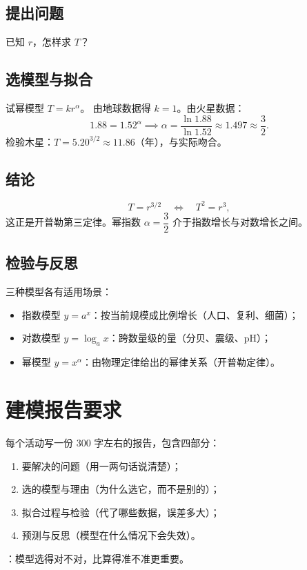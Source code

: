 \subsection{提出问题}
已知 $r$，怎样求 $T$？

\subsection{选模型与拟合}
试幂模型 $T=kr^{\alpha}$。
由地球数据得 $k=1$。由火星数据：
\[
  1.88=1.52^{\alpha}\implies\alpha=\frac{\ln1.88}{\ln1.52}\approx1.497\approx\frac32.
\]
检验木星：$T=5.20^{3/2}\approx11.86$（年），与实际吻合。

\subsection{结论}
\[
  T=r^{3/2}\quad\Longleftrightarrow\quad T^2=r^3,
\]
这正是开普勒第三定律。幂指数 $\alpha=\dfrac32$ 介于指数增长与对数增长之间。

\subsection{检验与反思}
三种模型各有适用场景：
\begin{itemize}
  \item 指数模型 $y=a^x$：按当前规模成比例增长（人口、复利、细菌）；
  \item 对数模型 $y=\log_a x$：跨数量级的量（分贝、震级、pH）；
  \item 幂模型 $y=x^{\alpha}$：由物理定律给出的幂律关系（开普勒定律）。
\end{itemize}

\section{建模报告要求}
每个活动写一份 300 字左右的报告，包含四部分：
\begin{enumerate}
  \item 要解决的问题（用一两句话说清楚）；
  \item 选的模型与理由（为什么选它，而不是别的）；
  \item 拟合过程与检验（代了哪些数据，误差多大）；
  \item 预测与反思（模型在什么情况下会失效）。
\end{enumerate}
：模型选得对不对，比算得准不准更重要。
